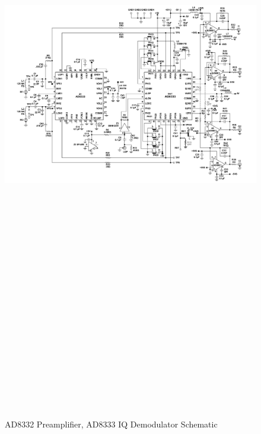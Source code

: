 \begin{landscape}
	\begin{figure}[htbp]
		\centering
		\includegraphics[width=20cm,height=28.7cm,keepaspectratio]{Figures/appendix/ad8333evalz.pdf}
		\caption{AD8332 Preamplifier, AD8333 IQ Demodulator Schematic}
		\label{fig:appendix_ad8333}
	\end{figure}
\end{landscape}
